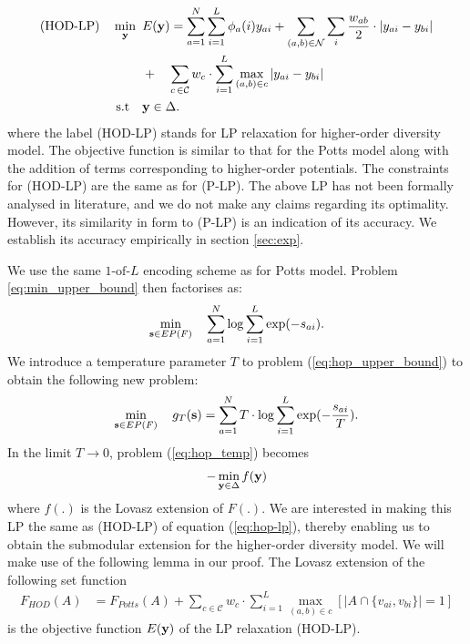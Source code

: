 \begin{align}
    \text{(HOD-LP)} \quad \min_{\bf y} \enskip & E({\bf y}) =  \sum_{a = 1}^N
    \sum_{i = 1}^L \phi_a(i)y_{ai} + 
    \sum_{(a, b) \in {\mathcal N}} \sum_{i} \frac{w_{ab}}{2} \cdot |y_{ai} - y_{bi}| \nonumber\\
    & + \quad \sum_{c \, \in {\mathcal C}} w_c \cdot \sum_{i = 1}^L \max_{(a, b) \in c} |y_{ai} - y_{bi}| \nonumber\\
    \text{s.t} \quad &{\bf y} \in \Delta.
\label{eq:hop-lp}
\end{align}
where the label (HOD-LP) stands for LP relaxation for higher-order diversity
model. The objective function is similar to that for the Potts model along with
the addition of terms corresponding to higher-order potentials. The constraints
for (HOD-LP) are the same as for (P-LP). The above LP has not been formally
analysed in literature, and we do not make any claims regarding its
optimality. However, its similarity in form to (P-LP) is an indication of its accuracy. We establish its accuracy empirically in section \ref{sec:exp}. 
 
 We use the same $1\text{-of-}L$ encoding
scheme as for Potts model. Problem \ref{eq:min_upper_bound} then factorises as: 
\begin{equation}
\min_{{\bf s} \in EP(F)} \quad \sum_{a = 1}^{N} \log \sum_{i = 1}^L \exp(-s_{ai}).
\label{eq:hop_upper_bound}
\end{equation}
We introduce a temperature parameter $T$ to problem (\ref{eq:hop_upper_bound}) to obtain the following new problem:
\begin{equation}
    \min_{{\bf s} \in EP(F)} \quad g_T ({\bf s}) = \sum_{a = 1}^{N} T \cdot \log \sum_{i = 1}^L \exp(-\frac{s_{ai}}{T}).
\label{eq:hop_temp}
\end{equation}
In the limit $T \to 0$, problem (\ref{eq:hop_temp}) becomes
\begin{align}
    - \min_{{\bf y} \in \Delta} f({\bf y}) 
\end{align}
where $f(.)$ is the Lovasz extension of $F(.)$. We are interested in making
this LP the same as (HOD-LP) of equation (\ref{eq:hop-lp}), thereby enabling us to obtain the submodular extension for the higher-order diversity model. We will make use of the following lemma in our proof. 
{\lemma The Lovasz extension of the following set function 
  \begin{align}
      F_{HOD}(A) &= F_{Potts}(A) + \nonumber \sum_{c \in {\mathcal C}} w_c \cdot \sum_{i = 1}^L \max_{(a, b) \in c} [|A \cap \{v_{ai}, v_{bi}\}| = 1]
\label{hod_submodular}
\end{align}
is the objective function $E({\bf y})$ of the LP relaxation (HOD-LP).
\label{lemma:hod_extension}}
\newline

